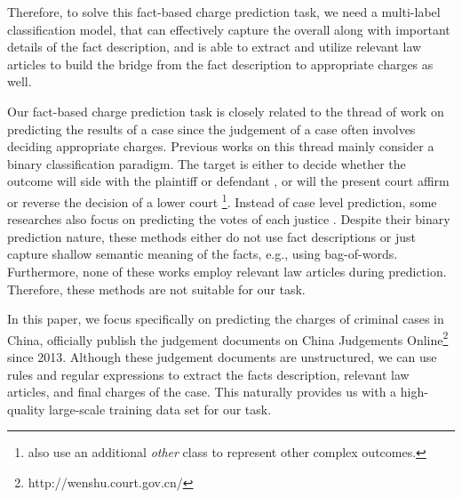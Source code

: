 Therefore, to solve this fact-based charge prediction task, we need a multi-label classification model, that can effectively capture the overall  along with important details of the fact description, and is able to extract and utilize relevant law articles to build the bridge from the fact description to appropriate charges as well. 

Our fact-based charge prediction task is closely related to the thread of work on predicting the results of a case since the judgement of a case often involves deciding appropriate charges. Previous works on this thread mainly consider a binary classification paradigm. The target is either to decide whether the outcome will side with the plaintiff or defendant \cite{aletras2016predicting}, or will the present court affirm or reverse the decision of a lower court \cite{katz2016general} \footnote{\cite{katz2016general} also use an additional \emph{other} class to represent other complex outcomes.}. Instead of case level prediction, some researches also focus on predicting the votes of each justice \cite{martin2002dynamic,lauderdale2014scaling,sim2015utility}. Despite their binary prediction nature, these methods either do not use fact descriptions or just capture shallow semantic meaning of the facts, e.g., using bag-of-words. Furthermore, none of these works employ relevant law articles during prediction. Therefore, these methods are not suitable for our task. 

In this paper, we focus specifically on predicting the charges of criminal cases in China,  officially publish the judgement documents on China Judgements Online\footnote{http://wenshu.court.gov.cn/} since 2013. Although these judgement documents are unstructured, we can use rules and regular expressions to extract the facts description, relevant law articles, and final charges of the case. This naturally provides us with a high-quality large-scale training data set for our task.

